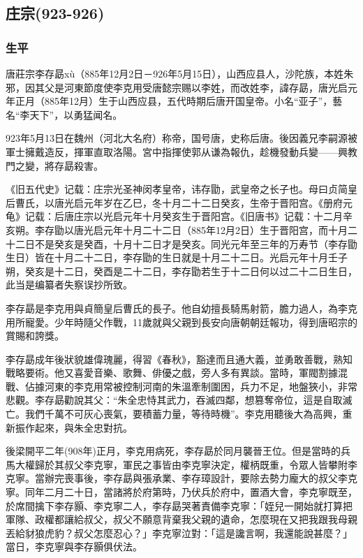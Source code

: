 
\subsection{庄宗\tiny(923-926)}

\subsubsection{生平}


唐莊宗李存勗xù（885年12月2日－926年5月15日），山西应县人，沙陀族，本姓朱邪，因其父是河東節度使李克用受唐懿宗赐以李姓，而改姓李，諱存勗，唐光启元年正月（885年12月）生于山西应县，五代時期后唐开国皇帝。小名“亚子”，藝名“李天下”，以勇猛闻名。

923年5月13日在魏州（河北大名府）称帝，国号唐，史称后唐。後因義兄李嗣源被軍士擁戴造反，揮軍直取洛陽。宮中指揮使郭从谦為報仇，趁機發動兵變——興教門之變，將存勗殺害。

《旧五代史》记载：庄宗光圣神闵孝皇帝，讳存勖，武皇帝之长子也。母曰贞简皇后曹氏，以唐光启元年岁在乙巳，冬十月二十二日癸亥，生帝于晋阳宫。《册府元龟》记载：后唐庄宗以光启元年十月癸亥生于晋阳宫。《旧唐书》记载：十二月辛亥朔。李存勖以唐光启元年十月二十二日（885年12月2日）生于晋阳宫，而十月二十二日不是癸亥是癸酉，十月十二日才是癸亥。同光元年至三年的万寿节（李存勖生日）皆在十月二十二日，李存勖的生日就是十月二十二日。光启元年十月壬子朔，癸亥是十二日，癸酉是二十二日，李存勖若生于十二日何以过二十二日生日，此当是编纂者失察误抄所致。

李存勗是李克用與貞簡皇后曹氏的長子。他自幼擅長騎馬射箭，膽力過人，為李克用所寵愛。少年時隨父作戰，11歲就與父親到長安向唐朝朝廷報功，得到唐昭宗的賞賜和誇獎。

李存勗成年後狀貌雄偉瑰麗，得習《春秋》，豁達而且通大義，並勇敢善戰，熟知戰略要術。他又喜愛音樂、歌舞、俳優之戲，旁人多有異談。當時，軍閥割據混戰、佔據河東的李克用常被控制河南的朱溫牽制圍困，兵力不足，地盤狹小，非常悲觀。李存勗勸說其父：“朱全忠恃其武力，吞滅四鄰，想篡奪帝位，這是自取滅亡。我們千萬不可灰心喪氣，要積蓄力量，等待時機”。李克用聽後大為高興，重新振作起來，與朱全忠對抗。

後梁開平二年(908年)正月，李克用病死，李存勗於同月襲晉王位。但是當時的兵馬大權歸於其叔父李克寧，軍民之事皆由李克寧決定，權柄既重，令眾人皆攀附李克寧。當辦完喪事後，李存勗與張承業、李存璋設計，要除去勢力龐大的叔父李克寧。同年二月二十日，當諸將於府第時，乃伏兵於府中，置酒大會，李克寧既至，於席間擒下李存顥、李克寧二人，李存勗哭著責備李克寧：「姪兒一開始就打算把軍隊、政權都讓給叔父，叔父不願意背棄我父親的遺命，怎麼現在又把我跟我母親丟給豺狼虎豹？叔父怎麼忍心？」李克寧泣對：「這是讒言啊，我還能說甚麼？」當日，李克寧與李存顥俱伏法。

